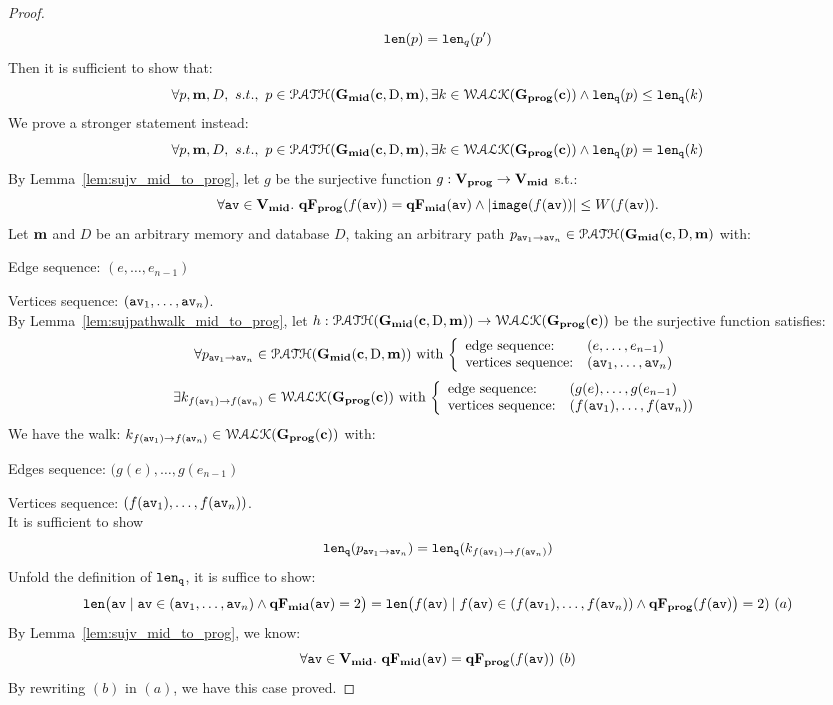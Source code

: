 \begin{proof}
\[  \mathtt{len}(p) = \mathtt{len}_q(p')
\]
%
Then it is sufficient to show that:
%
\[
  \forall p, {\boldsymbol{\mathbf{m}}}, D, ~ s.t., ~ p \in \mathcal{PATH}(\mathtt{\bf{G_{mid}}}({\boldsymbol{\mathbf{c}}}, \text{D}, {\boldsymbol{\mathbf{m}}}),
  \exists k \in \mathcal{WALK}(\mathtt{\bf{G_{prog}}}({\boldsymbol{\mathbf{c}}})) \land 
  \mathtt{len}_{\tt q}(p) \leq \mathtt{len}_{\tt q}(k)
\]
%
We prove a stronger statement instead:
\[
  \forall p, {\boldsymbol{\mathbf{m}}}, D, ~ s.t., ~ p \in \mathcal{PATH}(\mathtt{\bf{G_{mid}}}({\boldsymbol{\mathbf{c}}}, \text{D}, {\boldsymbol{\mathbf{m}}}),
  \exists k \in \mathcal{WALK}(\mathtt{\bf{G_{prog}}}({\boldsymbol{\mathbf{c}}})) \land 
  \mathtt{len}_{\tt q}(p) = \mathtt{len}_{\tt q}(k) 
\]
%
%
By Lemma~\ref{lem:sujv_mid_to_prog}, let $g$ be the surjective function $g: \mathtt{\bf{V_{prog}}} \to \mathtt{\bf{V_{mid}}}$ s.t.:
%
$$
\forall \mathtt{av} \in \mathtt{\bf{V_{mid}}}. ~ \mathtt{\bf{qF_{prog}}}(f(\mathtt{av})) = \mathtt{\bf{qF_{mid}}}(\mathtt{av}) 
\land |\mathtt{image}(f(\mathtt{av}))| \leq W(f(\mathtt{av})).
$$
%
%
%
Let ${\boldsymbol{\mathbf{m}}}$ and $D$ be an arbitrary memory and database $D$,
taking an arbitrary path $p_{\mathtt{av}_1 \to \mathtt{av}_n} \in \mathcal{PATH}(\mathtt{\bf{G_{mid}}}({\boldsymbol{\mathbf{c}}}, \text{D}, {\boldsymbol{\mathbf{m}}})$ with:
%
\item Edge sequence: $(e, \ldots, e_{n-1})$
%
\item Vertices sequence: $(\mathtt{av}_1, \ldots, \mathtt{av}_n)$.
\\
By Lemma~\ref{lem:sujpathwalk_mid_to_prog}, let $h: \mathcal{PATH}(\mathtt{\bf{G_{mid}}}({\boldsymbol{\mathbf{c}}}, \text{D}, {\boldsymbol{\mathbf{m}}})) \to \mathcal{WALK}(\mathtt{\bf{G_{prog}}}({\boldsymbol{\mathbf{c}}}))$ be the surjective function satisfies:
%
\[
  \forall p_{\av_1 \to \av_n} \in \paths(\midG(\ssa{c}, \text{D}, \ssa{m}))
  \text{ with }
  \left\{
  \begin{array}{ll}
  \mbox{edge sequence:} & (e, \ldots, e_{n-1})
  \\ 
  \mbox{vertices sequence:} & (\av_1, \ldots, \av_n)
  \end{array}
  \right.
\]
%
\[
  \exists k_{f(\av_1) \to f(\av_n)} \in \walks(\progG(\ssa{c}))
  \text{ with }
  \left\{
  \begin{array}{ll}
  \mbox{edge sequence:} & (g(e), \ldots, g(e_{n-1}) 
  \\ 
  \mbox{vertices sequence:} & (f(\av_1), \ldots, f(\av_{n}))
  \end{array}
  \right.
\]
%
We have the walk:
$k_{f(\mathtt{av}_1) \to f(\mathtt{av}_n)} \in \mathcal{WALK}(\mathtt{\bf{G_{prog}}}({\boldsymbol{\mathbf{c}}}))$ with:
%
\item Edges sequence: $(g(e), \ldots, g(e_{n-1}) $
%
\item Vertices sequence: $(f(\mathtt{av}_1), \ldots, f(\mathtt{av}_{n}))$.
\\
It is sufficient to show 
%
\[
  \mathtt{len}_{\tt q}(p_{\mathtt{av}_1 \to \mathtt{av}_n}) = \mathtt{len}_{\tt q}(k_{f(\mathtt{av}_1) \to f(\mathtt{av}_n)})
\]
%
Unfold the definition of $\mathtt{len}_{\tt q}$, it is suffice to show:
\[
\mathtt{len} \big( \mathtt{av} \mid \mathtt{av} \in (\mathtt{av}_1, \ldots, \mathtt{av}_n) \land \mathtt{\bf{qF_{mid}}}(\mathtt{av}) = 2 \big) 
= \mathtt{len} \big(f(\mathtt{av}) \mid f(\mathtt{av}) \in (f(\mathtt{av}_1), \ldots, f(\mathtt{av}_{n})) \land \mathtt{\bf{qF_{prog}}}(f(\mathtt{av})\big) = 2) 
~ (a)
\]
%
By Lemma~\ref{lem:sujv_mid_to_prog}, we know:
%
\[
  \forall \mathtt{av} \in \mathtt{\bf{V_{mid}}}. ~ \mathtt{\bf{qF_{mid}}}(\mathtt{av}) = \mathtt{\bf{qF_{prog}}}(f(\mathtt{av})) ~(b)
\]
By rewriting $(b)$ in $(a)$, we have this case proved.

\end{proof}